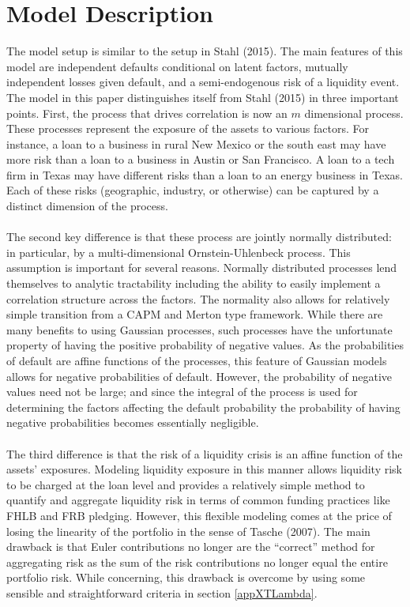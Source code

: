 \documentclass[12pt]{article}
\theoremstyle{definition}
\begin{document}
\section{Model Description}
The model setup is similar to the setup in Stahl (2015).  The main features of this model are independent defaults conditional on latent factors, mutually independent losses given default, and a semi-endogenous risk of a liquidity event.  The model in this paper distinguishes itself from Stahl (2015) in three important points.  First, the process that drives correlation is now an \(m\) dimensional process.  These processes represent the exposure of the assets to various factors.  For instance, a loan to a business in rural New Mexico or the south east may have more risk than a loan to a business in Austin or San Francisco.  A loan to a tech firm in Texas may have different risks than a loan to an energy business in Texas.  Each of these risks (geographic, industry, or otherwise) can be captured by a distinct dimension of the process.  
\\
\\
The second key difference is that these process are jointly normally distributed: in particular, by a multi-dimensional Ornstein-Uhlenbeck process.  This assumption is important for several reasons.  Normally distributed processes lend themselves to analytic tractability including the ability to easily implement a correlation structure across the factors.  The normality also allows for relatively simple transition from a CAPM and Merton type framework.  While there are many benefits to using Gaussian processes, such processes have the unfortunate property of having the positive probability of negative values.  As the probabilities of default are affine functions of the processes, this feature of Gaussian models allows for negative probabilities of default.  However, the probability of negative values need not be large; and since the integral of the process is used for determining the factors affecting the default probability the probability of having negative probabilities becomes essentially negligible.  
\\
\\
The third difference is that the risk of a liquidity crisis is an affine function of the assets' exposures.  Modeling liquidity exposure in this manner allows liquidity risk to be charged at the loan level and provides a relatively simple method to quantify and aggregate liquidity risk in terms of common funding practices like FHLB and FRB pledging.  However, this flexible modeling comes at the price of losing the linearity of the portfolio in the sense of Tasche (2007).  The main drawback is that Euler contributions no longer are the ``correct'' method for aggregating risk as the sum of the risk contributions no longer equal the entire portfolio risk.  While concerning, this drawback is overcome by using some sensible and straightforward criteria in section \ref{appXTLambda}.
\end{document}
